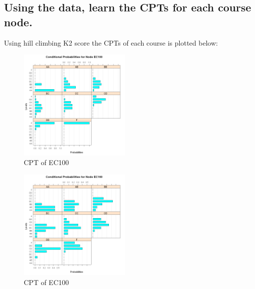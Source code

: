 \documentclass[15pt,journal]{IEEEtran}
\begin{document}
\subsection{Using the data, learn the CPTs for each course node.}


Using hill climbing K2 score the CPTs of each course is plotted below:\\



\begin{figure}[H]%
\begin {center}
\includegraphics[width=0.48\textwidth]{images/EC100.png}
\caption{CPT of EC100} %
\label{fig:ecg}
\end {center}
\end{figure}

\begin{figure}[H]%
\begin {center}
\includegraphics[width=0.48\textwidth]{images/EC160.png}
\caption{CPT of EC100} %
\label{fig:ecg}
\end {center}
\end{figure}
\end{document}
